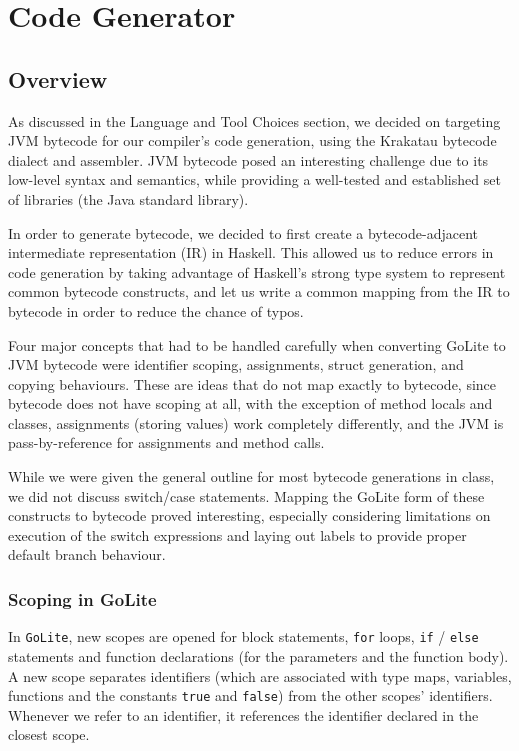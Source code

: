 \documentclass[11pt]{article}
\begin{document}
\section{Code Generator}
\subsection{Overview}

As discussed in the Language and Tool Choices section, we decided on
targeting JVM bytecode for our compiler's code generation, using the
Krakatau bytecode dialect and assembler. JVM bytecode posed an
interesting challenge due to its low-level syntax and semantics, while
providing a well-tested and established set of libraries (the Java
standard library).

In order to generate bytecode, we decided to first create a
bytecode-adjacent intermediate representation (IR) in Haskell. This
allowed us to reduce errors in code generation by taking advantage of
Haskell's strong type system to represent common bytecode constructs,
and let us write a common mapping from the IR to bytecode in order to
reduce the chance of typos.

Four major concepts that had to be handled carefully when converting
GoLite to JVM bytecode were identifier scoping, assignments, struct
generation, and copying behaviours. These are ideas that do not map
exactly to bytecode, since bytecode does not have scoping at all, with
the exception of method locals and classes, assignments (storing
values) work completely differently, and the JVM is pass-by-reference
for assignments and method calls.

While we were given the general outline for most bytecode generations
in class, we did not discuss switch/case statements. Mapping the
GoLite form of these constructs to bytecode proved interesting,
especially considering limitations on execution of the switch
expressions and laying out labels to provide proper default branch
behaviour.

\subsubsection{Scoping in GoLite}
In \texttt{GoLite}, new scopes are opened for block statements,
\texttt{for} loops, \texttt{if} / \texttt{else} statements and
function declarations (for the parameters and the function body). A
new scope separates identifiers (which are associated with type maps,
variables, functions and the constants \texttt{true} and
\texttt{false}) from the other scopes' identifiers. Whenever we refer
to an identifier, it references the identifier declared in the closest
scope.
\end{document}
